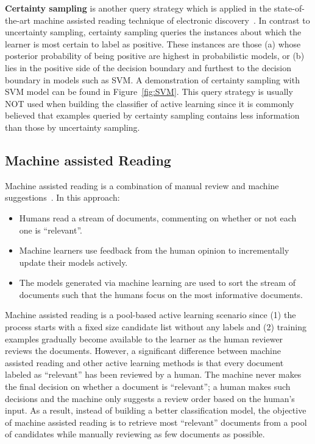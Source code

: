 \documentclass[final,twocolumn,5p]{elsarticle}
\theoremstyle{break}
\begin{document}
\textbf{Certainty sampling} is another query strategy which is applied in the state-of-the-art machine assisted reading technique of electronic discovery~\cite{cormack2014evaluation,cormack2015autonomy}. In contrast to uncertainty sampling, certainty sampling queries the instances about which the learner is most certain to label as positive. These instances are those (a) whose posterior probability of being positive are highest in probabilistic models, or (b) lies in the positive side of the decision boundary and furthest to the decision boundary in models such as SVM. A demonstration of certainty sampling with SVM model can be found in Figure~\ref{fig:SVM}. This query strategy is usually NOT used when building the classifier of active learning since it is commonly believed that examples queried by certainty sampling contains less information than those by uncertainty sampling.

\subsection{Machine assisted Reading}
\label{sect: Machine assisted Reading}

Machine assisted reading is a combination of manual review and machine
suggestions~\cite{tredennick2015}. In this approach:
\begin{itemize}
\item
Humans read a stream of documents, commenting on whether or
not each one is ``relevant''.
\item
  Machine learners use feedback from the human opinion to
  incrementally update their models actively.
\item
  The models generated via machine learning are used
  to sort the stream of documents such that the humans focus on the
  most informative documents.
  \end{itemize}

Machine assisted reading is a
pool-based active learning scenario since (1) the process starts with a fixed size candidate list without any labels and (2) training examples gradually become available to the learner as the human reviewer reviews the documents.  However, a significant difference between machine assisted reading and other active learning methods is that every document labeled as ``relevant'' has been reviewed by a human. The machine never makes the final decision on whether a document is ``relevant''; a human makes such decisions and the machine only suggests a review order based on the human's input. As a result, instead of building a better classification model, the objective of machine assisted reading is to retrieve most ``relevant'' documents from a pool of candidates while manually reviewing as few documents as possible. 
\end{document}

